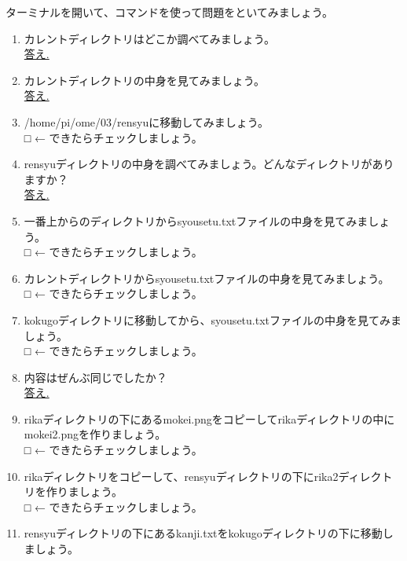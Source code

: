 
\begin{tcolorbox}[title=\useOmetoi,breakable]
\begin{figure}[H]
    \centering
    
\end{figure}
ターミナルを開いて、コマンドを使って問題をといてみましょう。\\
\begin{enumerate}
\item カレントディレクトリはどこか調べてみましょう。\\
\underline{答え.\hspace{0.8\linewidth}}
\item カレントディレクトリの中身を見てみましょう。\\
\underline{答え.\hspace{0.8\linewidth}}
\item /home/pi/ome/03/rensyuに移動してみましょう。\\
□ ← できたらチェックしましょう。
\item rensyuディレクトリの中身を調べてみましょう。どんなディレクトリがありますか？\\
\underline{答え.\hspace{0.8\linewidth}}
\item 一番上からのディレクトリからsyousetu.txtファイルの中身を見てみましょう。\\
□ ← できたらチェックしましょう。
\item カレントディレクトリからsyousetu.txtファイルの中身を見てみましょう。\\
□ ← できたらチェックしましょう。
\item kokugoディレクトリに移動してから、syousetu.txtファイルの中身を見てみましょう。\\
□ ← できたらチェックしましょう。
\item 内容はぜんぶ同じでしたか？\\
\underline{答え.\hspace{0.8\linewidth}}
\item rikaディレクトリの下にあるmokei.pngをコピーしてrikaディレクトリの中にmokei2.pngを作りましょう。\\
□ ← できたらチェックしましょう。
\item rikaディレクトリをコピーして、rensyuディレクトリの下にrika2ディレクトリを作りましょう。\\
□ ← できたらチェックしましょう。
\item rensyuディレクトリの下にあるkanji.txtをkokugoディレクトリの下に移動しましょう。\\

\end{enumerate}
\end{tcolorbox}
